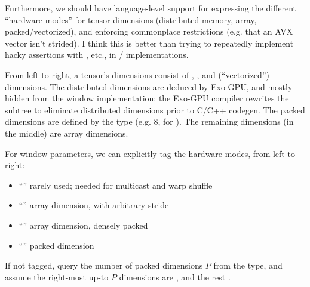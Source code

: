 \filbreak
Furthermore, we should have language-level support for expressing the different ``hardware modes'' for tensor dimensions (distributed memory, array, packed/vectorized), and enforcing commonplace restrictions (e.g. that an AVX vector isn't strided).
I think this is better than trying to repeatedly implement hacky assertions with , etc., in / implementations.

\filbreak
{}

From left-to-right, a tensor's dimensions consist of , , and  (``vectorized'') dimensions.
The distributed dimensions are deduced by Exo-GPU, and mostly hidden from the window implementation; the Exo-GPU compiler rewrites the subtree to eliminate distributed dimensions prior to C/C++ codegen.
The packed dimensions are defined by the  type (e.g. 8, for ).
The remaining dimensions (in the middle) are array dimensions.




\filbreak




\filbreak
For window parameters, we can explicitly tag the hardware modes, from left-to-right:
\begin{itemize}
  \item ``'' rarely used; needed for multicast and warp shuffle
  \filbreak
  \item ``'' array dimension, with arbitrary stride
  \filbreak
  \item ``'' array dimension, densely packed
  \filbreak
  \item ``'' packed dimension
\end{itemize}

\filbreak

\filbreak
{} If not tagged, query the number of packed dimensions $P$ from the  type, and assume the right-most up-to $P$ dimensions are , and the rest .

\filbreak
{}



